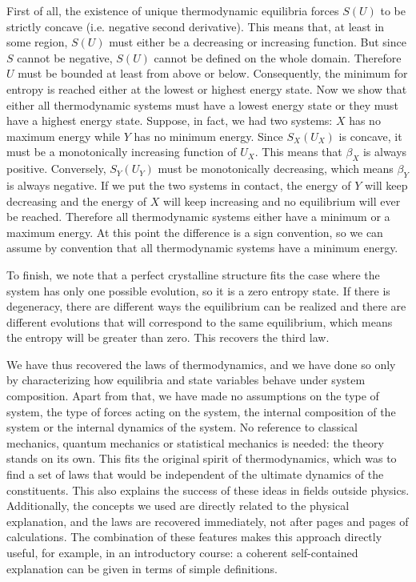 \documentclass[letterpaper,twocolumn]{article}
\begin{document}
First of all, the existence of unique thermodynamic equilibria forces $S(U)$ to be strictly concave (i.e. negative second derivative). This means that, at least in some region, $S(U)$ must either be a decreasing or increasing function. But since $S$ cannot be negative, $S(U)$ cannot be defined on the whole domain. Therefore $U$ must be bounded at least from above or below. Consequently, the minimum for entropy is reached either at the lowest or highest energy state. Now we show that either all thermodynamic systems must have a lowest energy state or they must have a highest energy state. Suppose, in fact, we had two systems: $X$ has no maximum energy while $Y$ has no minimum energy. Since $S_X(U_X)$ is concave, it must be a monotonically increasing function of $U_X$. This means that $\beta_X$ is always positive. Conversely, $S_Y(U_Y)$ must be monotonically decreasing, which means $\beta_Y$ is always negative. If we put the two systems in contact, the energy of $Y$ will keep decreasing and the energy of $X$ will keep increasing and no equilibrium will ever be reached. Therefore all thermodynamic systems either have a minimum or a maximum energy. At this point the difference is a sign convention, so we can assume by convention that all thermodynamic systems have a minimum energy.

To finish, we note that a perfect crystalline structure fits the case where the system has only one possible evolution, so it is a zero entropy state. If there is degeneracy, there are different ways the equilibrium can be realized and there are different evolutions that will correspond to the same equilibrium, which means the entropy will be greater than zero. This recovers the third law.

We have thus recovered the laws of thermodynamics, and we have done so only by characterizing how equilibria and state variables behave under system composition. Apart from that, we have made no assumptions on the type of system, the type of forces acting on the system, the internal composition of the system or the internal dynamics of the system. No reference to classical mechanics, quantum mechanics or statistical mechanics is needed: the theory stands on its own. This fits the original spirit of thermodynamics, which was to find a set of laws that would be independent of the ultimate dynamics of the constituents. This also explains the success of these ideas in fields outside physics. Additionally, the concepts we used are directly related to the physical explanation, and the laws are recovered immediately, not after pages and pages of calculations. The combination of these features makes this approach directly useful, for example, in an introductory  course: a coherent self-contained explanation can be given in terms of simple definitions.
\end{document}

